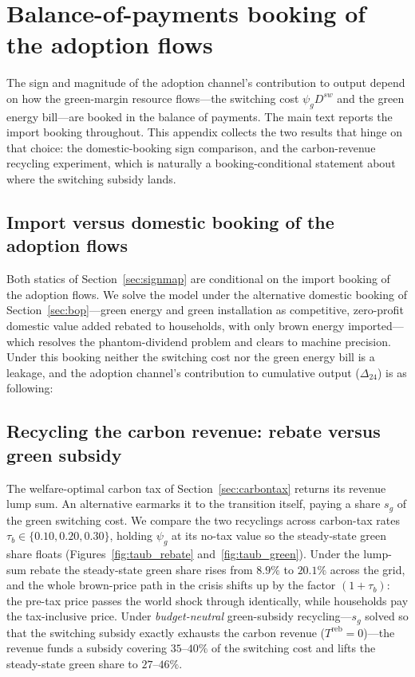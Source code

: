 \documentclass[11pt,a4paper]{article}
\begin{document}
\appendix

\section{Balance-of-payments booking of the adoption flows}
\label{app:booking}

The sign and magnitude of the adoption channel's contribution to output depend
on how the green-margin resource flows---the switching cost $\psi_g D^{sw}$ and
the green energy bill---are booked in the balance of payments. The main text
reports the import booking throughout. This appendix collects the two results
that hinge on that choice: the domestic-booking sign comparison, and the
carbon-revenue recycling experiment, which is naturally a booking-conditional
statement about where the switching subsidy lands.

\subsection{Import versus domestic booking of the adoption flows}\label{app:booking_flows}
Both statics of Section~\ref{sec:signmap} are conditional on the import booking of the
adoption flows. We solve the model under the alternative domestic booking of
Section~\ref{sec:bop}---green energy and green installation as competitive,
zero-profit domestic value added rebated to households, with only brown energy
imported---which resolves the phantom-dividend problem and clears to machine
precision. Under this booking neither the switching cost nor the green energy
bill is a leakage, and the adoption channel's contribution to cumulative output
($\Delta_{24}$) is as following:


\subsection{Recycling the carbon revenue: rebate versus green subsidy}
\label{sec:recycle}

The welfare-optimal carbon tax of Section~\ref{sec:carbontax} returns its
revenue lump sum. An alternative earmarks it to the transition itself, paying a
share $s_g$ of the green switching cost. We compare the two recyclings across
carbon-tax rates $\tau_b\in\{0.10,0.20,0.30\}$, holding $\psi_g$ at its no-tax
value so the steady-state green share floats (Figures~\ref{fig:taub_rebate}
and~\ref{fig:taub_green}). Under the lump-sum rebate the steady-state green
share rises from $8.9\%$ to $20.1\%$ across the grid, and the whole brown-price
path in the crisis shifts up by the factor $(1+\tau_b)$: the pre-tax price
passes the world shock through identically, while households pay the
tax-inclusive price. Under \emph{budget-neutral} green-subsidy recycling---$s_g$
solved so that the switching subsidy exactly exhausts the carbon revenue
($T^{\mathrm{reb}}=0$)---the revenue funds a subsidy covering $35$--$40\%$ of
the switching cost and lifts the steady-state green share to $27$--$46\%$.
\end{document}
